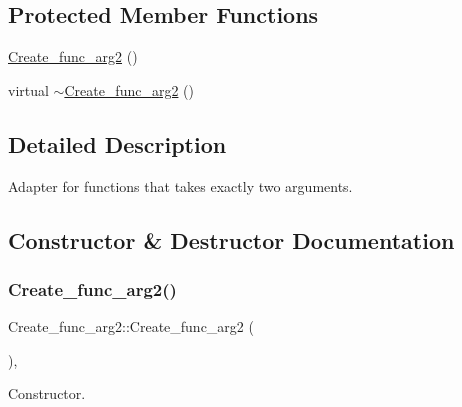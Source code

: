 \subsection*{Protected Member Functions}
\begin{DoxyCompactItemize}
\item 
\mbox{\hyperlink{classCreate__func__arg2_a6b4b06f96c8a42f2fe1c7935016b2716}{Create\+\_\+func\+\_\+arg2}} ()
\item 
virtual \mbox{\hyperlink{classCreate__func__arg2_a02a04b1f5ede4ded16c754da74642756}{$\sim$\+Create\+\_\+func\+\_\+arg2}} ()
\end{DoxyCompactItemize}


\subsection{Detailed Description}
Adapter for functions that takes exactly two arguments. 

\subsection{Constructor \& Destructor Documentation}
\mbox{\label{classCreate__func__arg2_a6b4b06f96c8a42f2fe1c7935016b2716}} 
\subsubsection{\texorpdfstring{Create\+\_\+func\+\_\+arg2()}{Create\_func\_arg2()}}
{\footnotesize\ttfamily Create\+\_\+func\+\_\+arg2\+::\+Create\+\_\+func\+\_\+arg2 (\begin{DoxyParamCaption}{ }\end{DoxyParamCaption})\hspace{0.3cm}{\ttfamily [inline]}, {\ttfamily [protected]}}

Constructor. \mbox{\label{classCreate__func__arg2_a02a04b1f5ede4ded16c754da74642756}} 
